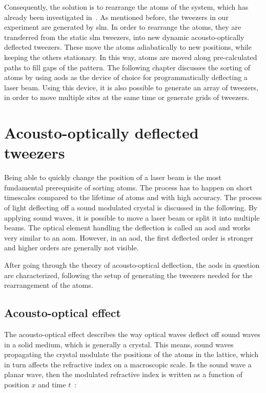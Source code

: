 Consequently, the solution is to rearrange the atoms of the system, which has already been investigated in~\cite{Barredo2016, Endres2016, Barredo2018}. As mentioned before, the tweezers in our experiment are generated by \ac{slm}. In order to rearrange the atoms, they are transferred from the static \ac{slm} tweezers, into new dynamic acousto-optically deflected tweezers. These move the atoms adiabatically to new positions, while keeping the others stationary. In this way, atoms are moved along pre-calculated paths to fill gaps of the pattern. The following chapter discusses the sorting of atoms by using \acp{aod} as the device of choice for programmatically deflecting a laser beam. Using this device, it is also possible to generate an array of tweezers, in order to move multiple sites at the same time or generate grids of tweezers.


\section{Acousto-optically deflected tweezers}

Being able to quickly change the position of a laser beam is the most fundamental prerequisite of sorting atoms. The process has to happen on short timescales compared to the lifetime of atoms and with high accuracy. The process of light deflecting off a sound modulated crystal is discussed in the following. By applying sound waves, it is possible to move a laser beam or split it into multiple beams. The optical element handling the deflection is called an \ac{aod} and works very similar to an \ac{aom}. However, in an \ac{aod}, the first deflected order is stronger and higher orders are generally not visible.

After going through the theory of acousto-optical deflection, the \acp{aod} in question are characterized, following the setup of generating the tweezers needed for the rearrangement of the atoms.

\subsection{Acousto-optical effect}

The acousto-optical effect describes the way optical waves deflect off sound waves in a solid medium, which is generally a crystal. This means, sound waves propagating the crystal modulate the positions of the atoms in the lattice, which in turn affects the refractive index on a macroscopic scale. Is the sound wave a planar wave, then the modulated refractive index is written as a function of position $x$ and time $t$~\cite{Saleh1991}:


